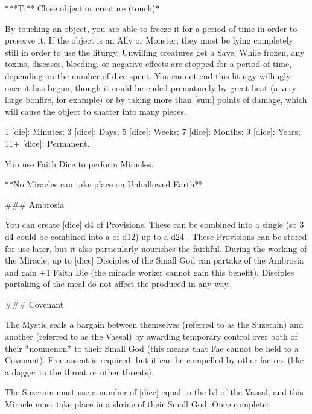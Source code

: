 ***T:**   Close object or creature (touch)*



By touching an object, you are able to freeze it for a period of time in order to preserve it.  If the object is an Ally or Monster, they must be lying completely still in order to use the liturgy.  Unwilling creatures get a Save.  While frozen, any toxins, diseases, bleeding, or negative effects are stopped for a period of time, depending on the number of dice spent.  You cannot end this liturgy willingly once it has begun, though it could be ended prematurely by great heat (a very large bonfire, for example) or by taking more than [sum] points of damage, which will cause the object to shatter into many pieces.  

1 [die]: Minutes; 3 [dice]: Days; 5 [dice]: Weeks; 7 [dice]: Months; 9 [dice]: Years; 11+ [dice]: Permanent. 







You use Faith Dice to perform Miracles.  

**No Miracles can take place on Unhallowed Earth**



### Ambrosia

You can create [dice] d4 \UD of Provisions.  These \UD can be combined into a single \UD (so 3 d4 \UD could be combined into a \UD of d12) up to a d24 \UD.  These Provisions can be stored for use later, but it also particularly nourishes the faithful.  During the working of the Miracle, up to [dice] Disciples of the Small God can partake of the Ambrosia and gain +1 Faith Die (the miracle worker cannot gain this benefit). Disciples partaking of the meal do not affect the \UD produced in any way.

### Covenant


The Mystic seals a bargain between themselves (referred to as the Suzerain) and another (referred to as the Vassal) by awarding temporary control over both of their *noumenon* to their Small God (this means that Fae cannot be held to a Covenant).  Free assent is required, but it can be compelled by other factors (like a dagger to the throat or other threats).

The Suzerain must use a number of [dice] equal to the {lvl} of the Vassal, and this Miracle must take place in a shrine of their Small God.  Once complete: 

